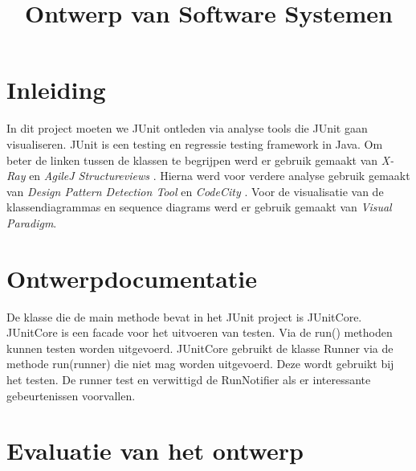 \documentclass[a4paper, 11pt]{article}
\begin{document}
\begin{titlepage}
\title{Ontwerp van Software Systemen}
\author{}
\end{titlepage}



\maketitle
\newpage
\tableofcontents
\pagebreak

\section*{Inleiding}


In dit project moeten we JUnit ontleden via analyse tools die JUnit gaan visualiseren. JUnit is een testing en regressie testing framework in Java. Om beter de linken tussen de klassen te begrijpen werd er gebruik gemaakt van \emph{X-Ray} \cite{X-Ray} en \emph{AgileJ Structureviews} \cite{AgileJ Structureviews}. Hierna werd voor verdere analyse gebruik gemaakt van \emph{Design Pattern Detection Tool} \cite{Design Pattern Detection Tool} en \emph{CodeCity} \cite{CodeCity}. Voor de visualisatie van de klassendiagrammas en sequence diagrams werd er gebruik gemaakt van \emph{Visual Paradigm}.


\section{Ontwerpdocumentatie}

De klasse die de main methode bevat in het JUnit project is JUnitCore. JUnitCore is een facade voor het uitvoeren van testen. Via de run() methoden kunnen testen worden uitgevoerd. JUnitCore gebruikt de klasse Runner via de methode run(runner) die niet mag worden uitgevoerd. Deze wordt gebruikt bij het testen. De runner test en verwittigd de RunNotifier als er interessante gebeurtenissen voorvallen. 





\section{Evaluatie van het ontwerp}

\end{document}
